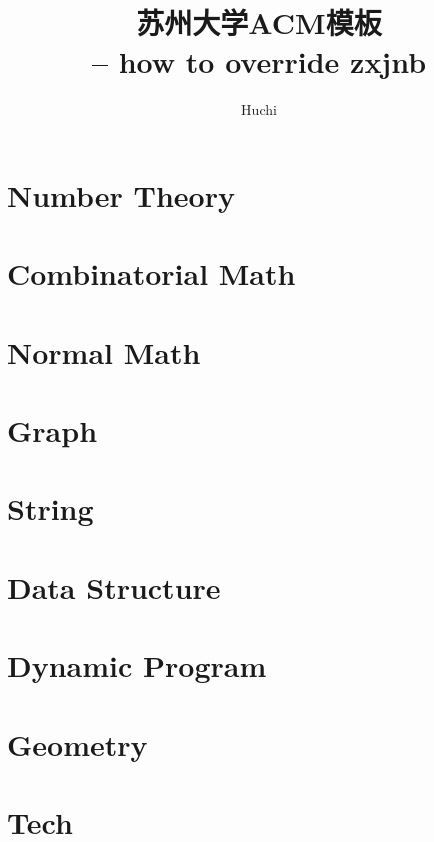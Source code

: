 \documentclass[a4paper,UTF8]{article}  %
\title{ \bfseries 苏州大学ACM模板 \\ \small-- how to override zxjnb}
\author{Huchi}
\begin{document}
\small
	\begin{titlepage}
		\maketitle
	\end{titlepage}



\newpage
\pagestyle{empty}
\renewcommand{\contentsname}{How to Override zxjnb:}
\tableofcontents %
\newpage\clearpage
\newpage	
\pagestyle{fancy}
\setcounter{page}{1}   %




\section{Number Theory}


\section{Combinatorial Math}


\section{Normal Math}


\section{Graph}


\section{String}


\section{Data Structure}


\section{Dynamic Program}

\section{Geometry}

\section{Tech}










\end{document}
